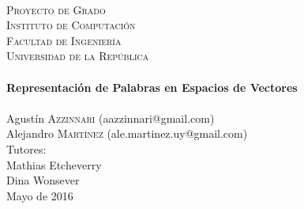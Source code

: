 \begin{titlepage}
  \begin{center}

    \textsc{\LARGE}\\[1.0cm]
    \textsc{\LARGE Proyecto de Grado}\\[1.5cm]

    \textsc{\Large Instituto de Computación}\\[0.2cm]
    \textsc{\Large Facultad de Ingeniería}\\[0.2cm]
    \textsc{\Large Universidad de la República}\\[2.0cm]

    \HRule\\[0.6cm]
    {\Huge \bfseries Representación de Palabras en Espacios de Vectores}\\[0.3cm]
    \HRule\\[2.3cm]

    {\Large Agustín \textsc{Azzinnari}} {\small (aazzinnari@gmail.com)}\\
    {\Large Alejandro \textsc{Martínez}} {\small (ale.martinez.uy@gmail.com)}\\[2.0cm]

    {\small Tutores:}\\
    {\normalsize Mathias Etcheverry}\\
    {\normalsize Dina Wonsever}\\[1.5cm]

    Mayo de 2016\\

    \vfill

  \end{center}
\end{titlepage}

